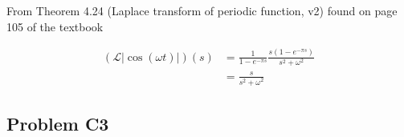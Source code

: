 \documentclass[a4paper,10pt,reqno]{amsart}
\numberwithin{equation}{section}
\newcommand{\lap}{\mathscr{L}}
\begin{document}
From Theorem 4.24 (Laplace transform of periodic function, v2) found on page 105 of the textbook

\begin{align}
(\lap|{\cos(\omega t)|})(s) &= \frac{1}{1 - e^{-\pi s}}\frac{s(1 - e^{-\pi s})}{s^2 + \omega^2} \\
&= \frac{s}{s^2 + \omega^2}
\end{align}


\subsection{Problem C3}\label{sec:c3}








\end{document}

